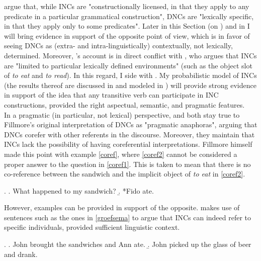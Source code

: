 \textcite[55]{TonelliDelmonte2011} argue that, while INCs are "constructionally licensed, in that they apply to any predicate in a particular grammatical construction", DNCs are "lexically specific, in that they apply only to some predicates". Later in this Section (on ) and in  I will bring evidence in support of the opposite point of view, which is in favor of seeing DNCs as (extra- and intra-linguistically) contextually, not lexically, determined. Moreover, \textcite{TonelliDelmonte2011}'s account is in direct conflict with \textcite[95]{Fillmore1986}, who argues that INCs are "limited to particular lexically defined environments" (such as the object slot of \textit{to eat} and \textit{to read}). In this regard, I side with \textcite{TonelliDelmonte2011}. My probabilistic model of INCs (the results thereof are discussed in  and modeled in ) will provide strong evidence in support of the idea that any transitive verb can participate in INC constructions, provided the right aspectual, semantic, and pragmatic features.\\
In a pragmatic (in particular, not lexical) perspective, \textcite[44]{AnderBois} and \textcite[53-54]{Melchin2019} both stay true to Fillmore's original interpretation of DNCs as "pragmatic anaphoras", arguing that DNCs corefer with other referents in the discourse. Moreover, they maintain that INCs lack the possibility of having coreferential interpretations. Fillmore himself \parencite[97]{Fillmore1986} made this point with example \ref{coref}, where \ref{coref2} cannot be considered a proper answer to the question in \ref{coref1}. This is taken to mean that there is no co-reference between the sandwich and the implicit object of \textit{to eat} in \ref{coref2}.

\ex. \label{coref} \a. \label{coref1} What happened to my sandwich?
\b. \label{coref2} *Fido ate.

However, examples can be provided in support of the opposite. \textcite[142-144]{groefsema1995understood} makes use of sentences such as the ones in \ref{groefsema} to argue that INCs can indeed refer to specific individuals, provided sufficient linguistic context.

\ex. \label{groefsema} \a. \label{groefsema1} John brought the sandwiches and Ann ate.
\b. \label{groefsema2} John picked up the glass of beer and drank.


